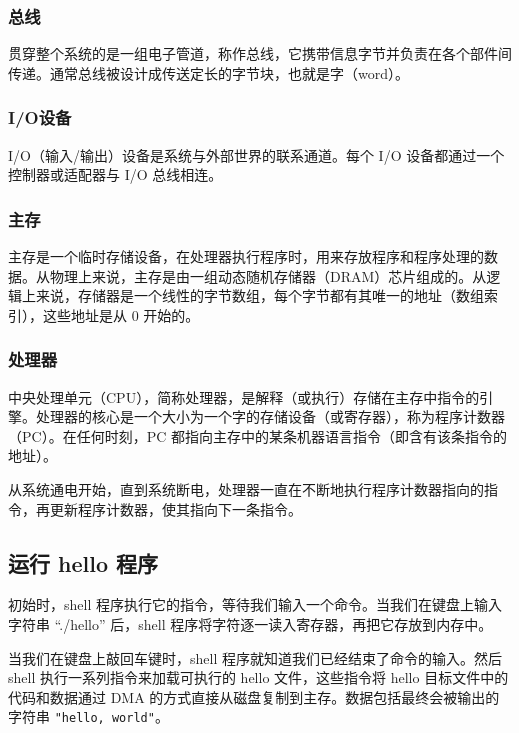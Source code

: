 \subsubsection{总线}

贯穿整个系统的是一组电子管道，称作总线，它携带信息字节并负责在各个部件间传递。通常总线被设计成传送定长的字节块，也就是字（word）。

\subsubsection{I/O设备}

I/O（输入/输出）设备是系统与外部世界的联系通道。每个 I/O 设备都通过一个控制器或适配器与 I/O 总线相连。

\subsubsection{主存}

主存是一个临时存储设备，在处理器执行程序时，用来存放程序和程序处理的数据。从物理上来说，主存是由一组动态随机存储器（DRAM）芯片组成的。从逻辑上来说，存储器是一个线性的字节数组，每个字节都有其唯一的地址（数组索引），这些地址是从 0 开始的。

\subsubsection{处理器}

中央处理单元（CPU），简称处理器，是解释（或执行）存储在主存中指令的引擎。处理器的核心是一个大小为一个字的存储设备（或寄存器），称为程序计数器（PC）。在任何时刻，PC 都指向主存中的某条机器语言指令（即含有该条指令的地址）。

从系统通电开始，直到系统断电，处理器一直在不断地执行程序计数器指向的指令，再更新程序计数器，使其指向下一条指令。

\subsection{运行 hello 程序}

初始时，shell 程序执行它的指令，等待我们输入一个命令。当我们在键盘上输入字符串 ``./hello'' 后，shell 程序将字符逐一读入寄存器，再把它存放到内存中。

当我们在键盘上敲回车键时，shell 程序就知道我们已经结束了命令的输入。然后 shell 执行一系列指令来加载可执行的 hello 文件，这些指令将 hello 目标文件中的代码和数据通过 DMA 的方式直接从磁盘复制到主存。数据包括最终会被输出的字符串 \texttt{"hello, world\n"}。

